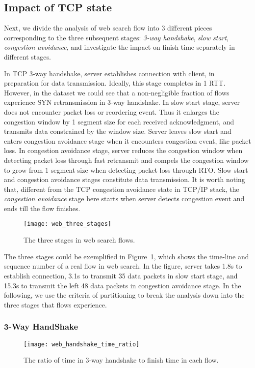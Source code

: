\subsection{Impact of TCP state}

Next, we divide the analysis of web search flow into 3 different pieces corresponding to the three subsequent stages: \emph{3-way handshake}, \emph{slow start}, \emph{congestion avoidance}, and investigate the impact on finish time separately in different stages.

In TCP 3-way handshake, server establishes connection with client, in preparation for data transmission. Ideally, this stage completes in 1 RTT. However, in the dataset we could see that a non-negligible fraction of flows experience SYN retransmission in 3-way handshake. In slow start stage, server does not encounter packet loss or reordering event. Thus it enlarges the congestion window by 1 segment size for each received acknowledgment, and transmits data constrained by the window size. Server leaves slow start and enters congestion avoidance stage when it encounters congestion event, like packet loss. In congestion avoidance stage, server reduces the congestion window when detecting packet loss through fast retransmit\cite{jacobson1988congestion} and compels the congestion window to grow from 1 segment size when detecting packet loss through RTO. Slow start and congestion avoidance stages constitute data transmission. It is worth noting that, different from the TCP congestion avoidance state in TCP/IP stack, the \emph{congestion avoidance} stage here starts when server detects congestion event and ends till the flow finishes. 

\begin{figure}[th]
\centering
\texttt{[image: web\_three\_stages]}
\caption{The three stages in web search flows.}
\label{fig:web_three_stages}
\end{figure}

The three stages could be exemplified in Figure~\ref{fig:web_three_stages}, which shows the time-line and sequence number of a real flow in web search. In the figure, server takes 1.8s to establish connection, 3.1s to transmit 35 data packets in slow start stage, and 15.3s to transmit the left 48 data packets in congestion avoidance stage. In the following, we use the criteria of partitioning to break the analysis down into the three stages that flows experience.

\subsubsection{3-Way HandShake}
\begin{figure}[th]
\centering
\texttt{[image: web\_handshake\_time\_ratio]}
\caption{The ratio of time in 3-way handshake to finish time in each flow.}
\label{fig:web_handshake_ratio}
\end{figure}

